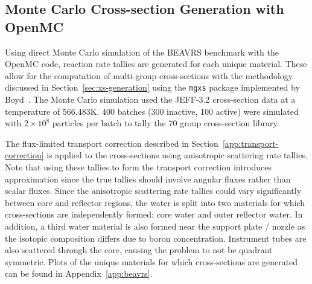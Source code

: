 \begin{appendices}
\section{Monte Carlo Cross-section Generation with OpenMC}
\label{sec:openmc-xs}

Using direct Monte Carlo simulation of the BEAVRS benchmark with the OpenMC code, reaction rate tallies are generated for each unique material. These allow for the computation of multi-group cross-sections with the methodology discussed in Section~\ref{sec:xs-generation} using the \texttt{mgxs} package implemented by Boyd~\cite{boyd2017thesis}. The Monte Carlo simulation used the JEFF-3.2 cross-section data at a temperature of 566.483K. 400 batches (300 inactive, 100 active) were simulated with $2 \times 10^8$ particles per batch to tally the 70 group cross-section library. 

The flux-limited transport correction described in Section~\ref{app:transport-correction} is applied to the cross-sections using anisotropic scattering rate tallies. Note that using these tallies to form the transport correction introduces approximation since the true tallies should involve angular fluxes rather than scalar fluxes. Since the anisotropic scattering rate tallies could vary significantly between core and reflector regions, the water is split into two materials for which cross-sections are independently formed: core water and outer reflector water. In addition, a third water material is also formed near the support plate / nozzle as the isotopic composition differs due to boron concentration. Instrument tubes are also scattered through the core, causing the problem to not be quadrant symmetric. Plots of the unique materials for which cross-sections are generated can be found in Appendix~\ref{app:beavrs}.


\end{appendices}
